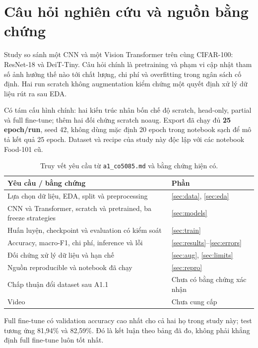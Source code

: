 \documentclass[11pt,a4paper]{article}
\begin{document}

\section{Câu hỏi nghiên cứu và nguồn bằng chứng}\label{sec:aim}
Study so sánh một CNN và một Vision Transformer trên cùng CIFAR-100: ResNet-18 và DeiT-Tiny. Câu hỏi chính là pretraining và phạm vi cập nhật tham số ảnh hưởng thế nào tới chất lượng, chi phí và overfitting trong ngân sách cố định. Hai run scratch không augmentation kiểm chứng một quyết định xử lý dữ liệu rút ra sau EDA.

Có tám cấu hình chính: hai kiến trúc nhân bốn chế độ scratch, head-only, partial và full fine-tune; thêm hai đối chứng scratch noaug. Export đã chạy đủ \textbf{25 epoch/run}, seed 42, không dùng mặc định 20 epoch trong notebook sạch để mô tả kết quả 25 epoch. Dataset và recipe của study này độc lập với các notebook Food-101 cũ.

\begin{table}[htbp]\centering\small\caption{Truy vết yêu cầu từ \texttt{a1\_co5085.md} và bằng chứng hiện có.}
\begin{tabularx}{\linewidth}{Xl}\toprule Yêu cầu / bằng chứng & Phần\\\midrule
Lựa chọn dữ liệu, EDA, split và preprocessing & \ref{sec:data}, \ref{sec:eda}\\
CNN và Transformer, scratch và pretrained, ba freeze strategies & \ref{sec:models}\\
Huấn luyện, checkpoint và evaluation có kiểm soát & \ref{sec:train}\\
Accuracy, macro-F1, chi phí, inference và lỗi & \ref{sec:results}--\ref{sec:errors}\\
Đối chứng xử lý dữ liệu và hạn chế & \ref{sec:aug}, \ref{sec:limits}\\
Nguồn reproducible và notebook đã chạy & \ref{sec:repro}\\
Chấp thuận đổi dataset sau A1.1 & Chưa có bằng chứng xác nhận\\
Video & Chưa cung cấp\\\bottomrule\end{tabularx}\end{table}

Full fine-tune có validation accuracy cao nhất cho cả hai họ trong study này; test tương ứng 81,94\% và 82,59\%. Đó là kết luận theo bảng đã đo, không phải khẳng định full fine-tune luôn tốt nhất.
\disclosure
\clearpage
\end{document}
